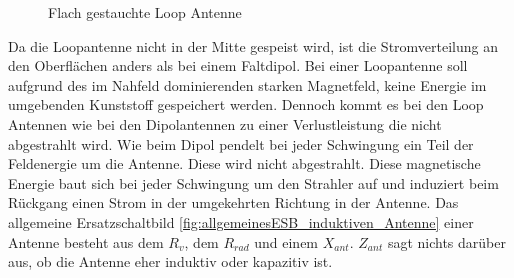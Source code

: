 \begin{figure}[!ht]
	\begin{center}
	\end{center}
\caption{Flach gestauchte Loop Antenne}
\label{fig:FflacheLoopAntenne}
\end{figure}

Da  die Loopantenne nicht in der Mitte gespeist wird, ist die Stromverteilung an den Oberflächen anders als bei einem Faltdipol. Bei einer Loopantenne soll aufgrund des im Nahfeld dominierenden starken Magnetfeld, keine Energie im umgebenden Kunststoff gespeichert werden. Dennoch kommt es bei den Loop Antennen wie bei den Dipolantennen zu einer Verlustleistung die nicht abgestrahlt wird. Wie beim Dipol pendelt bei jeder Schwingung ein Teil der Feldenergie um die Antenne. Diese wird nicht abgestrahlt. Diese magnetische Energie baut sich bei jeder Schwingung um den Strahler auf und induziert beim Rückgang einen Strom in der umgekehrten Richtung in der Antenne. Das allgemeine Ersatzschaltbild \ref{fig:allgemeinesESB_induktiven_Antenne} einer Antenne besteht aus dem $R_{v}$, dem $R_{rad}$ und einem $X_{ant}$. $Z_{ant}$ sagt nichts darüber aus, ob die Antenne eher induktiv oder kapazitiv ist.



